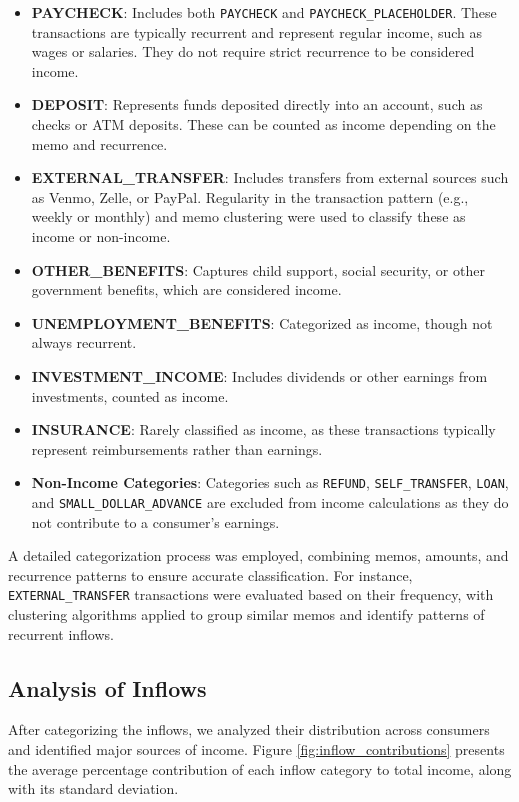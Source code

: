 \documentclass[12pt,letterpaper]{article}
\begin{document}
\begin{itemize}
    \item \textbf{PAYCHECK}: Includes both \texttt{PAYCHECK} and \texttt{PAYCHECK\_PLACEHOLDER}. These transactions are typically recurrent and represent regular income, such as wages or salaries. They do not require strict recurrence to be considered income.
    \item \textbf{DEPOSIT}: Represents funds deposited directly into an account, such as checks or ATM deposits. These can be counted as income depending on the memo and recurrence.
    \item \textbf{EXTERNAL\_TRANSFER}: Includes transfers from external sources such as Venmo, Zelle, or PayPal. Regularity in the transaction pattern (e.g., weekly or monthly) and memo clustering were used to classify these as income or non-income.
    \item \textbf{OTHER\_BENEFITS}: Captures child support, social security, or other government benefits, which are considered income.
    \item \textbf{UNEMPLOYMENT\_BENEFITS}: Categorized as income, though not always recurrent.
    \item \textbf{INVESTMENT\_INCOME}: Includes dividends or other earnings from investments, counted as income.
    \item \textbf{INSURANCE}: Rarely classified as income, as these transactions typically represent reimbursements rather than earnings.
    \item \textbf{Non-Income Categories}: Categories such as \texttt{REFUND}, \texttt{SELF\_TRANSFER}, \texttt{LOAN}, and \texttt{SMALL\_DOLLAR\_ADVANCE} are excluded from income calculations as they do not contribute to a consumer's earnings.
\end{itemize}

A detailed categorization process was employed, combining memos, amounts, and recurrence patterns to ensure accurate classification. For instance, \texttt{EXTERNAL\_TRANSFER} transactions were evaluated based on their frequency, with clustering algorithms applied to group similar memos and identify patterns of recurrent inflows.

\subsection{Analysis of Inflows}
After categorizing the inflows, we analyzed their distribution across consumers and identified major sources of income. Figure \ref{fig:inflow_contributions} presents the average percentage contribution of each inflow category to total income, along with its standard deviation.
\end{document}
